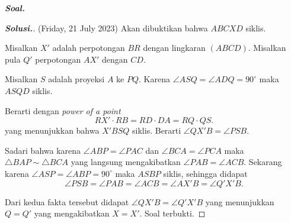 \textbf{\textit{Soal. }}

\begin{proof}[\textbf{Solusi.}]
(Friday, 21 July 2023)
Akan dibuktikan bahwa $ABCXD$ siklis. 

Misalkan $X'$ adalah perpotongan $BR$ dengan lingkaran $(ABCD)$. Misalkan pula $Q'$ perpotongan $AX'$ dengan $CD$.

Misalkan $S$ adalah proyeksi $A$ ke $PQ$. Karena $\angle ASQ = \angle ADQ = 90^\circ$ maka $ASQD$ siklis.



Berarti dengan \textit{power of a point}
$$RX'\cdot RB = RD\cdot DA = RQ\cdot QS.$$
yang menunjukkan bahwa $X'BSQ$ siklis. Berarti $\angle QX'B = \angle PSB$.

Sadari bahwa karena $\angle ABP = \angle PAC$ dan $\angle BCA = \angle PCA$ maka $\triangle BAP \sim \triangle BCA$ yang langsung mengakibatkan $\angle PAB = \angle ACB$.
Sekarang karena $\angle ASP = \angle ABP = 90^\circ$ maka $ASBP$ siklis, sehingga didapat $$\angle PSB = \angle PAB = \angle ACB = \angle AX'B = \angle Q'X'B.$$

Dari kedua fakta tersebut didapat $\angle QX'B = \angle Q'X'B$ yang menunjukkan $Q = Q'$ yang mengakibatkan $X = X'$. Soal terbukti.
\end{proof}



